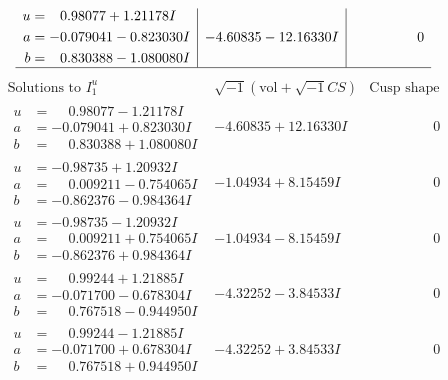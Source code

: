 \documentclass[1p]{elsarticle_modified}
\theoremstyle{definition}
\newcommand{\I}{\sqrt{-1}}
\begin{document}
$$\begin{array}{c|c|c}
\begin{aligned}
u &= \phantom{-}0.98077 + 1.21178 I \\
a &= -0.079041 - 0.823030 I \\
b &= \phantom{-}0.830388 - 1.080080 I\end{aligned}
 & -4.60835 - 12.16330 I & \phantom{-0.000000 } 0\\
 \hline 
 \end{array}$$\newpage$$\begin{array}{c|c|c}  
\text{Solutions to }I^u_{1}& \I (\text{vol} + \sqrt{-1}CS) & \text{Cusp shape}\\
 \hline 
\begin{aligned}
u &= \phantom{-}0.98077 - 1.21178 I \\
a &= -0.079041 + 0.823030 I \\
b &= \phantom{-}0.830388 + 1.080080 I\end{aligned}
 & -4.60835 + 12.16330 I & \phantom{-0.000000 } 0 \\ \hline\begin{aligned}
u &= -0.98735 + 1.20932 I \\
a &= \phantom{-}0.009211 - 0.754065 I \\
b &= -0.862376 - 0.984364 I\end{aligned}
 & -1.04934 + 8.15459 I & \phantom{-0.000000 } 0 \\ \hline\begin{aligned}
u &= -0.98735 - 1.20932 I \\
a &= \phantom{-}0.009211 + 0.754065 I \\
b &= -0.862376 + 0.984364 I\end{aligned}
 & -1.04934 - 8.15459 I & \phantom{-0.000000 } 0 \\ \hline\begin{aligned}
u &= \phantom{-}0.99244 + 1.21885 I \\
a &= -0.071700 - 0.678304 I \\
b &= \phantom{-}0.767518 - 0.944950 I\end{aligned}
 & -4.32252 - 3.84533 I & \phantom{-0.000000 } 0 \\ \hline\begin{aligned}
u &= \phantom{-}0.99244 - 1.21885 I \\
a &= -0.071700 + 0.678304 I \\
b &= \phantom{-}0.767518 + 0.944950 I\end{aligned}
 & -4.32252 + 3.84533 I & \phantom{-0.000000 } 0 \\ \hline\begin{aligned}

\end{aligned}
\end{array}$$
\end{document}
